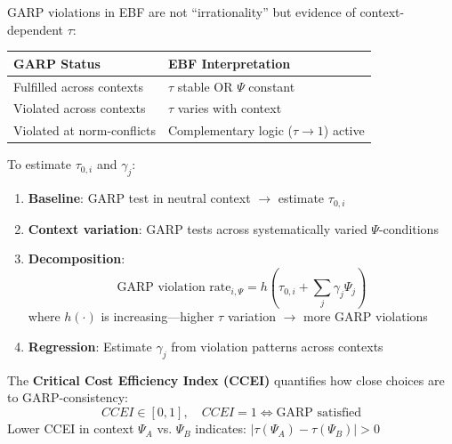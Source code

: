 \begin{definition}
\label{def:garp-tau}
GARP violations in EBF are not ``irrationality'' but evidence of context-dependent $\tau$:
\begin{table}[htbp]
\centering
\begin{tabular}{@{}ll@{}}
\toprule
\textbf{GARP Status} & \textbf{EBF Interpretation} \\
\midrule
Fulfilled across contexts & $\tau$ stable OR $\Psi$ constant \\
Violated across contexts & $\tau$ varies with context \\
Violated at norm-conflicts & Complementary logic ($\tau \rightarrow 1$) active \\
\bottomrule
\end{tabular}
\end{table}
\end{definition}

\begin{definition}
\label{def:garp-protocol}
To estimate $\tau_{0,i}$ and $\gamma_j$:
\begin{enumerate}
\item \textbf{Baseline}: GARP test in neutral context $\rightarrow$ estimate $\tau_{0,i}$
\item \textbf{Context variation}: GARP tests across systematically varied $\Psi$-conditions
\item \textbf{Decomposition}: 
\begin{equation}
\text{GARP violation rate}_{i,\Psi} = h(\tau_{0,i} + \sum_j \gamma_j \Psi_j)
\end{equation}
where $h(\cdot)$ is increasing---higher $\tau$ variation $\rightarrow$ more GARP violations
\item \textbf{Regression}: Estimate $\gamma_j$ from violation patterns across contexts
\end{enumerate}
\end{definition}

\begin{definition}
\label{def:ccei}
The \textbf{Critical Cost Efficiency Index (CCEI)} quantifies how close choices are to GARP-consistency:
\begin{equation}
CCEI \in [0,1], \quad CCEI = 1 \Leftrightarrow \text{GARP satisfied}
\end{equation}
Lower CCEI in context $\Psi_A$ vs. $\Psi_B$ indicates: $|\tau(\Psi_A) - \tau(\Psi_B)| > 0$
\end{definition}


